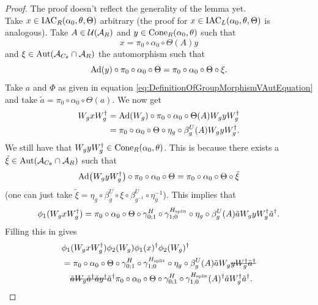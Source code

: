 \documentclass[11pt,a4paper,twoside]{article}
\numberwithin{equation}{section}
\begin{document}
	\begin{proof}
		{\color{red}The proof doesn't reflect the generality of the lemma yet.}\\
		Take $x\in \textrm{IAC}_R(\alpha_0,\theta,\Theta)$ arbitrary (the proof for $x\in \textrm{IAC}_L(\alpha_0,\theta,\Theta)$ is analogous). Take $A\in\mathcal U(\mathcal A_R)$ and $y\in\textrm{Cone}_R(\alpha_0,\theta)$ such that
		\begin{equation}
			x=\pi_0\circ\alpha_0\circ\Theta(A)y
		\end{equation}
		and $\xi\in\Aut{\AA_{C_\theta}\cap \AA_R}$ the automorphism such that
		\begin{equation}
			\Ad{y}\circ\pi_0\circ\alpha_0\circ\Theta=\pi_0\circ\alpha_0\circ\Theta\circ\xi.
		\end{equation}
		Take $a$ and $\Phi$ as given in equation \eqref{eq:DefinitionOfGroupMorphismVAutEquation} and take $\tilde{a}=\pi_0\circ\alpha_0\circ\Theta(a)$. We now get
		\begin{align}
			W_g x W_g^\dagger&=\Ad{W_g}\circ\pi_0\circ\alpha_0\circ\Theta(A) W_gyW_g^\dagger\\
			&=\pi_0\circ\alpha_0\circ\Theta\circ\eta_g\circ\beta_g^U(A) W_gyW_g^\dagger.
		\end{align}
		We still have that $W_g yW_g^\dagger\in\textrm{Cone}_R(\alpha_0,\theta)$. This is because there exists a $\tilde{\xi}\in\Aut{\AA_{C_\theta}\cap \AA_R}$ such that
		\begin{equation}
			\Ad{W_gyW_g^\dagger}\circ \pi_0\circ\alpha_0\circ\Theta=\pi_0\circ\alpha_0\circ\Theta\circ\tilde\xi
		\end{equation}
		(one can just take $\tilde\xi=\eta_g\circ\beta_g^U\circ\xi\circ\beta_{g^{-1}}^U\circ\eta_g^{-1}$). This implies that
		\begin{equation}\label{eq:lem:phi1phi2matchingCondition:Proof_W_g_PartAppendix}
			\phi_1(W_gxW_g^{\dagger})=\pi_0\circ\alpha_0\circ\Theta\circ\gamma^{H}_{0;1}\circ\gamma^{{H_{\text{split}}}}_{1;0}\circ\eta_g\circ\beta_g^U(A)\tilde{a}W_gyW_g^\dagger\tilde{a}^\dagger.
		\end{equation}
		Filling this in gives
		\begin{align}
			&\phi_1(W_gxW_g^\dagger)\phi_2(W_g)\phi_1(x)^\dagger\phi_2(W_g)^\dagger\\
			\label{eq:phi1phi2matchingConditionEquationAppendix}
			&=\pi_0\circ\alpha_0\circ\Theta\circ\gamma^{H}_{0;1}\circ\gamma^{\Hsplit}_{1;0}\circ\eta_g\circ\beta_g^U(A)\tilde{a}W_g\stkout{yW_g^\dagger\tilde{a}^\dagger}\\
			\nonumber
			&\quad\stkout{\tilde{a}W_g\tilde{a}^\dagger\tilde{a}y^\dagger}\tilde{a}^\dagger\pi_0\circ\alpha_0\circ\Theta\circ\gamma^{H}_{0;1}\circ\gamma^{\Hsplit}_{1;0}(A)^\dagger\tilde{a}W_g^\dagger\tilde{a}^\dagger.

\end{align}
\end{proof}
\end{document}
